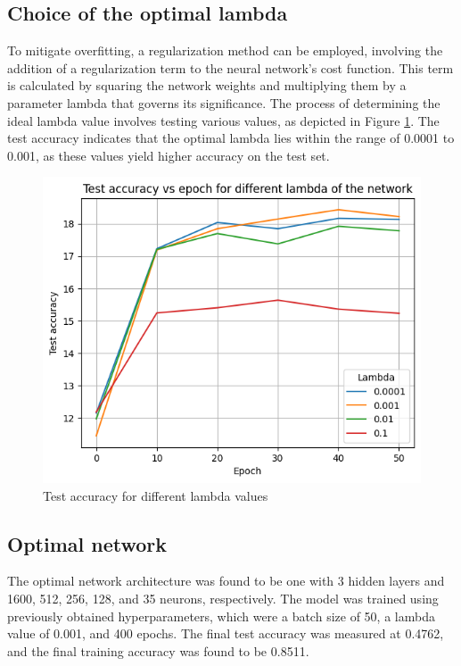 \documentclass{class}
\begin{document}
\subsection{Choice of the optimal lambda}

To mitigate overfitting, a regularization method can be employed, involving the addition of a regularization term to the neural network's cost function.
This term is calculated by squaring the network weights and multiplying them by a parameter lambda that governs its significance.
The process of determining the ideal lambda value involves testing various values, as depicted in Figure \ref{fig-4}.
The test accuracy indicates that the optimal lambda lies within the range of 0.0001 to 0.001, as these values yield higher accuracy on the test set.
\begin{figure}[H]
  \centering
  \includegraphics[width=.7\columnwidth]{images/lamda.png}
  \caption{Test accuracy for different lambda values}
  \label{fig-4}
\end{figure}

\subsection{Optimal network}
The optimal network architecture was found to be one with 3 hidden layers and 1600, 512, 256, 128, and 35 neurons, respectively.
The model was trained using previously obtained hyperparameters, which were a batch size of 50, a lambda value of 0.001, and 400 epochs.
The final test accuracy was measured at 0.4762, and the final training accuracy was found to be 0.8511.
\end{document}

